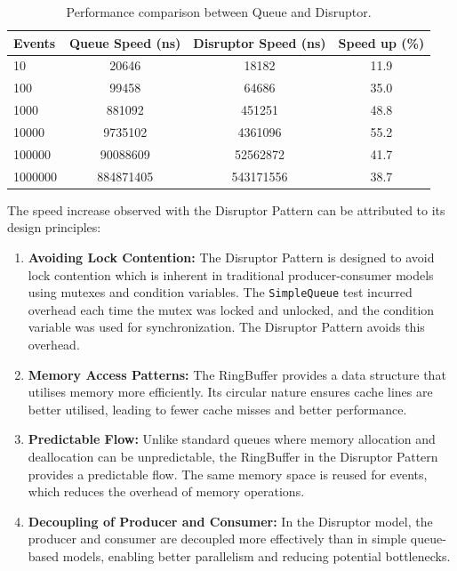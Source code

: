\documentclass{article}
\theoremstyle{break}
\begin{document}
\begin{table}[htbp]
\centering
\begin{tabular}{lccc}
\toprule
\textbf{Events} & \textbf{Queue Speed (ns)} & \textbf{Disruptor Speed (ns)} & \textbf{Speed up (\%)} \\
\midrule
10 & 20646 & 18182 & 11.9 \\
100 & 99458 & 64686 & 35.0\\
1000 & 881092 & 451251 & 48.8\\
10000 & 9735102 & 4361096 & 55.2\\
100000 & 90088609 & 52562872 & 41.7\\
1000000 & 884871405 & 543171556 & 38.7\\
\bottomrule
\end{tabular}
\caption{Performance comparison between Queue and Disruptor.}
\label{tab:performance_comparison}
\end{table}



\noindent The speed increase observed with the Disruptor Pattern can be attributed to its design principles:

\begin{enumerate}
    \item \textbf{Avoiding Lock Contention:} The Disruptor Pattern is designed to avoid lock contention which is inherent in traditional producer-consumer models using mutexes and condition variables. The \texttt{SimpleQueue} test incurred overhead each time the mutex was locked and unlocked, and the condition variable was used for synchronization. The Disruptor Pattern avoids this overhead.
    \item \textbf{Memory Access Patterns:} The RingBuffer provides a data structure that utilises memory more efficiently. Its circular nature ensures cache lines are better utilised, leading to fewer cache misses and better performance.
    \item \textbf{Predictable Flow:} Unlike standard queues where memory allocation and deallocation can be unpredictable, the RingBuffer in the Disruptor Pattern provides a predictable flow. The same memory space is reused for events, which reduces the overhead of memory operations.
    \item \textbf{Decoupling of Producer and Consumer:} In the Disruptor model, the producer and consumer are decoupled more effectively than in simple queue-based models, enabling better parallelism and reducing potential bottlenecks.
\end{enumerate}
\end{document}
